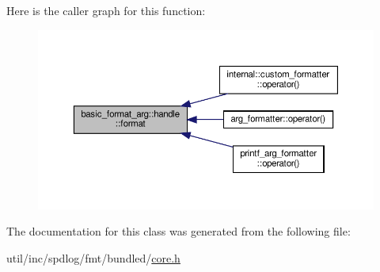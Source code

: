 Here is the caller graph for this function\+:
\nopagebreak
\begin{figure}[H]
\begin{center}
\leavevmode
\includegraphics[width=350pt]{classbasic__format__arg_1_1handle_a3ab20a0f53159f281076487aad60e146_icgraph}
\end{center}
\end{figure}


The documentation for this class was generated from the following file\+:\begin{DoxyCompactItemize}
\item 
util/inc/spdlog/fmt/bundled/\hyperlink{core_8h}{core.\+h}\end{DoxyCompactItemize}
